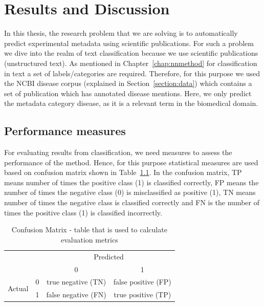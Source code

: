 \chapter{Results and Discussion}\label{chap: results}

In this thesis, the research problem that we are solving is to automatically predict experimental metadata using scientific publications. For such a problem we dive into the realm of text classification because we use scientific publications (unstructured text). As mentioned in Chapter~\ref{chap:nnmethod} for classification in text a set of labels/categories are required. Therefore, for this purpose we used the NCBI disease corpus (explained in Section~\ref{section:data}) which contains a set of publication which has annotated disease mentions. Here, we only predict the metadata category disease, as it is a relevant term in the biomedical domain. 

\section*{Performance measures}
For evaluating results from classification, we need measures to assess the performance of the method. Hence, for this purpose statistical measures are used based on confusion matrix shown in Table~\ref{tab:confusionmatrix}. In the confusion matrix, TP means number of times the positive class (1) is classified correctly, FP means the number of times the negative class (0) is misclassified as positive (1), TN means number of times the negative class is classified correctly and FN is the number of times the positive class (1) is classified incorrectly. 

\begin{table}[!htb]
    \centering
    \begin{tabular}{|c|c|c|c|}
\hline
\multicolumn{2}{|c|}{\multirow{2}{*}{}} & \multicolumn{2}{c|}{Predicted} \\ \cline{3-4} 
\multicolumn{2}{|c|}{} & 0 & 1 \\ \hline
\multirow{2}{*}{Actual} & 0 & true negative (TN) & false positive (FP) \\ \cline{2-4} 
 & 1 & false negative (FN) & true positive (TP) \\ \hline
\end{tabular}
    \caption{Confusion Matrix - table that is used to calculate evaluation metrics}
    \label{tab:confusionmatrix}
\end{table}

